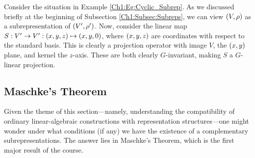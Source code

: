 \begin{boxexample}
    Consider the situation in Example \ref{Ch1:Eg:Cyclic_Subrep}. As we discussed briefly at the beginning of Subsection \ref{Ch1:Subsec:Subreps}, we can view $\left( V, \rho \right)$ as a subrepresentation of $\left( V', \rho' \right)$. Now, consider the linear map $S : V' \to V' : \left( x,y,z \right) \mapsto \left( x,y,0 \right)$, where $\left( x,y,z \right)$ are coordinates with respect to the standard basis. This is clearly a projection operator with image $V$, the $\left( x,y \right)$ plane, and kernel the $z$-axis. These are both clearly $G$-invariant, making $S$ a $G$-linear projection.
\end{boxexample}

\subsection{Maschke's Theorem}

Given the theme of this section---namely, understanding the compatibility of ordinary linear-algebraic constructions with representation structures---one might wonder under what conditions (if any) we have the existence of a complementary subrepresentations. The answer lies in Maschke's Theorem, which is the first major result of the course.

